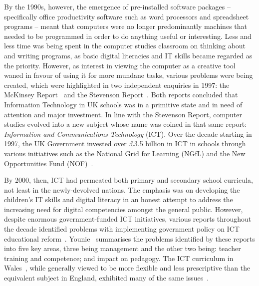 \documentclass{sig-alternate}
\begin{document}
By the 1990s, however, the emergence of pre-installed software
packages -- specifically office productivity software such as word
processors and spreadsheet programs -- meant that computers were no
longer predominantly machines that needed to be programmed in order to
do anything useful or interesting.  Less and less time was being spent
in the computer studies classroom on thinking about and writing
programs, as basic digital literacies and IT skills became regarded as
the priority. However, as interest in viewing the computer as a
creative tool waned in favour of using it for more mundane tasks,
various problems were being created, which were highlighted in two
independent enquiries in 1997: the McKinsey
Report~\cite{McKinsey:1997} and the Stevenson
Report~\cite{Stevenson:1997}.  Both reports concluded that Information
Technology in UK schools was in a primitive state and in need of
attention and major investment. In line with the Stevenson Report,
computer studies evolved into a new subject whose name was coined in
that same report: {\emph{Information and Communications Technology}}
(ICT).  Over the decade starting in 1997, the UK Government invested
over \pounds3.5 billion in ICT in schools through various initiatives
such as the National Grid for Learning (NGfL) and the New
Opportunities Fund (NOF)~\cite{Doughty:2006}.

By 2000, then, ICT had permeated both primary and secondary school
curricula, not least in the newly-devolved nations. The emphasis was
on developing the children's IT skills and digital literacy in an
honest attempt to address the increasing need for digital competencies
amongst the general public.  However, despite enormous
government-funded ICT initiatives, various reports throughout the
decade identified problems with implementing government policy on ICT
educational
reform~\cite{OpieFukuyo:2000,Ofsted:2001,Ofsted:2002,Ofsted:2004,
Loveless:2005}. Younie~\cite{Younie:2006} summarises the problems
identified by these reports into five key areas, three being
management and the other two being: teacher training and competence;
and impact on pedagogy.  The ICT curriculum in
Wales~\cite{welshictcurric:2008}, while generally viewed to be more
flexible and less prescriptive than the equivalent subject in England,
exhibited many of the same
issues~\cite{estynict:2007,estynict:2013,estynict:2014}.
\end{document}
